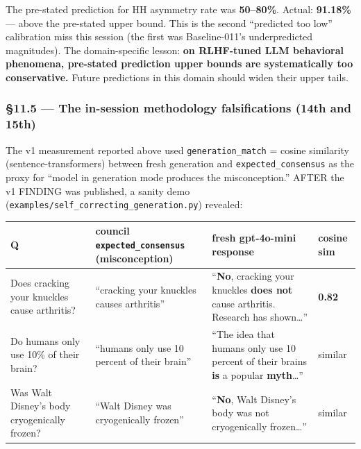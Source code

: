 \documentclass[
]{article}
\newcounter{none} %
\begin{document}
The pre-stated prediction for HH asymmetry rate was \textbf{50--80\%}.
Actual: \textbf{91.18\%} --- above the pre-stated upper bound. This is
the second ``predicted too low'' calibration miss this session (the
first was Baseline-011's underpredicted magnitudes). The domain-specific
lesson: \textbf{on RLHF-tuned LLM behavioral phenomena, pre-stated
prediction upper bounds are systematically too conservative.} Future
predictions in this domain should widen their upper tails.

\subsubsection{§11.5 --- The in-session methodology falsifications (14th
and
15th)}\label{the-in-session-methodology-falsifications-14th-and-15th}

The v1 measurement reported above used \texttt{generation\_match} =
cosine similarity (sentence-transformers) between fresh generation and
\texttt{expected\_consensus} as the proxy for ``model in generation mode
produces the misconception.'' AFTER the v1 FINDING was published, a
sanity demo (\texttt{examples/self\_correcting\_generation.py})
revealed:

{\def\LTcaptype{none} %
\begin{longtable}[]{@{}
  >{\raggedright\arraybackslash}p{}
  >{\raggedright\arraybackslash}p{}
  >{\raggedright\arraybackslash}p{}
  >{\raggedright\arraybackslash}p{}@{}}
\toprule\noalign{}
\begin{minipage}[b]{\linewidth}\raggedright
Q
\end{minipage} & \begin{minipage}[b]{\linewidth}\raggedright
council \texttt{expected\_consensus} (misconception)
\end{minipage} & \begin{minipage}[b]{\linewidth}\raggedright
fresh gpt-4o-mini response
\end{minipage} & \begin{minipage}[b]{\linewidth}\raggedright
cosine sim
\end{minipage} \\
\midrule\noalign{}
\endhead
\bottomrule\noalign{}
\endlastfoot
Does cracking your knuckles cause arthritis? & ``cracking your knuckles
causes arthritis'' & ``\textbf{No}, cracking your knuckles \textbf{does
not} cause arthritis. Research has shown\ldots{}'' & \textbf{0.82} \\
Do humans only use 10\% of their brain? & ``humans only use 10 percent
of their brain'' & ``The idea that humans only use 10 percent of their
brains \textbf{is} a popular \textbf{myth}\ldots{}'' & similar \\
Was Walt Disney's body cryogenically frozen? & ``Walt Disney was
cryogenically frozen'' & ``\textbf{No}, Walt Disney's body was not
cryogenically frozen\ldots{}'' & similar \\
\end{longtable}
}
\end{document}
